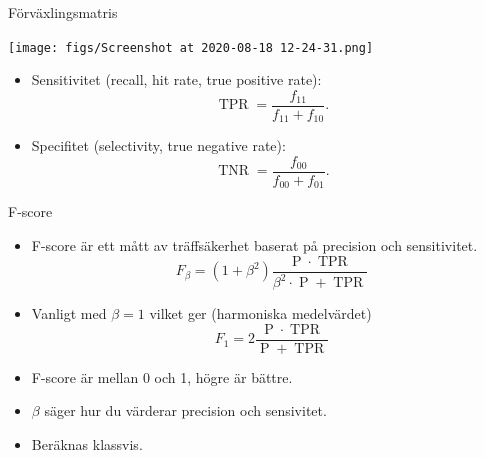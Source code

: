 \documentclass[10pt,english]{beamer}
\begin{document}
\begin{frame}{Förväxlingsmatris}
    \begin{center}
        \texttt{[image: figs/Screenshot at 2020-08-18 12-24-31.png]}
    \end{center}
    
    \begin{itemize}
        \item Sensitivitet (recall, hit rate, true positive rate):
        \begin{equation*}
            \operatorname{TPR} = \frac{f_{11} }{f_{11} + f_{10}}.
        \end{equation*}
        \item Specifitet (selectivity, true negative rate):
        \begin{equation*}
            \operatorname{TNR} = \frac{f_{00}}{f_{00} + f_{01}}.
        \end{equation*}
    \end{itemize}
        
\end{frame}

\begin{frame}{F-score}
    
    \begin{itemize}
        \item F-score är ett mått av träffsäkerhet baserat på precision och sensitivitet.
        \begin{equation*}
            F_{\beta} = (1 + \beta^2) \frac{\operatorname{P} \cdot \operatorname{TPR}}{\beta^2 \cdot \operatorname{P} + \operatorname{TPR}}
        \end{equation*}
        \item Vanligt med $\beta=1$ vilket ger (harmoniska medelvärdet)
        \begin{equation*}
            F_1 = 2 \frac{\operatorname{P} \cdot \operatorname{TPR}}{\operatorname{P} + \operatorname{TPR}}
        \end{equation*}
        \item F-score är mellan 0 och 1, högre är bättre.
        \item $\beta$ säger hur du värderar precision och sensivitet.
        \item Beräknas klassvis.
    \end{itemize}

\end{frame}
\end{document}
